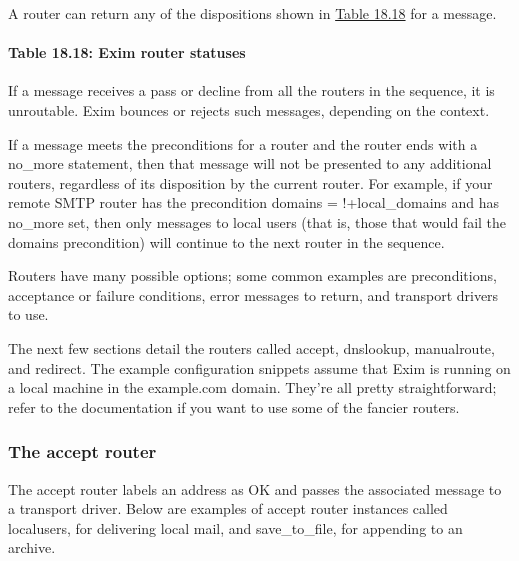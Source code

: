 A router can return any of the dispositions shown in
\protect\hyperlink{part0026_split_050.htmlux5cux23_idTextAnchor1147}{Table
18.18} for a message.

\paragraph[{Table 18.18: }Exim router statuses]{\texorpdfstring{{Table
18.18:
}\protect\hypertarget{part0026_split_050.htmlux5cux23_idTextAnchor1147}{}{}Exim
router statuses}{Table 18.18: Exim router statuses}}


If a message receives a {pass} or {decline} from all the routers in the
sequence, it is unroutable. Exim bounces or rejects such messages,
depending on the context.

If a message meets the preconditions for a router and the router ends
with a {no\_more} statement, then that message will not be presented to
any additional routers, regardless of its disposition by the current
router. For example, if your remote SMTP router has the precondition
{domains = !+local\_domains} and has {no\_more} set, then only messages
to local users (that is, those that would fail the {domains}
precondition) will continue to the next router in the sequence.

Routers have many possible options; some common examples are
preconditions, acceptance or failure conditions, error messages to
return, and transport drivers to use.

The next few sections detail the routers called {accept}, {dnslookup},
{manualroute}, and {redirect}. The example configuration snippets assume
that Exim is running on a local machine in the example.com domain.
They're all pretty straightforward; refer to the documentation if you
want to use some of the fancier routers.

\subsubsection[The {accept}
router]{\texorpdfstring{\protect\hypertarget{part0026_split_050.htmlux5cux23_idTextAnchor1148}{}{}The
{accept} router}{The accept router}}

\protect\hypertarget{part0026_split_050.htmlux5cux23_idTextAnchor1149}{}{}The
\protect\hypertarget{part0026_split_050.htmlux5cux23_idIndexMarker2655}{}{}{accept}
router labels an address as OK and passes the associated message to a
transport driver. Below are examples of {accept} router instances called
{localusers}, for delivering local mail, and {save\_to\_file}, for
appending to an archive.


